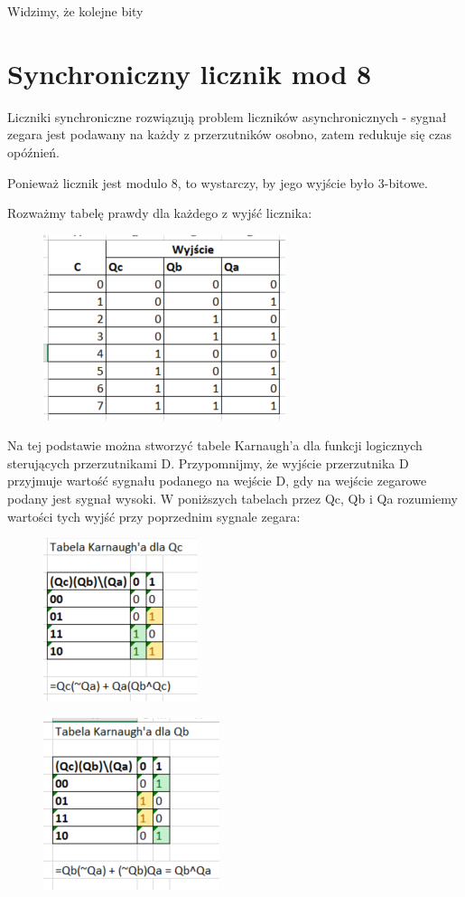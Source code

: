 \documentclass[12pt,a4paper]{article}
\begin{document}
Widzimy, że kolejne bity



\section{Synchroniczny licznik mod 8}

Liczniki synchroniczne rozwiązują problem liczników asynchronicznych - sygnał zegara jest podawany na każdy z przerzutników osobno, zatem redukuje się czas opóźnień.

Ponieważ licznik jest modulo 8, to wystarczy, by jego wyjście było 3-bitowe.

Rozważmy tabelę prawdy dla każdego z wyjść licznika:

\begin{figure}[H]
\centering
\includegraphics{img/4c_table}
\end{figure}

Na tej podstawie można stworzyć tabele Karnaugh'a dla funkcji logicznych sterujących przerzutnikami D.
Przypomnijmy, że wyjście przerzutnika D przyjmuje wartość sygnału podanego na wejście D, gdy na wejście zegarowe podany jest sygnał wysoki.
W poniższych tabelach przez Qc, Qb i Qa rozumiemy wartości tych wyjść przy poprzednim sygnale zegara:
 

\begin{figure}[H]
\centering
\includegraphics{img/4c_table_qc}
\end{figure}

\begin{figure}[H]
\centering
\includegraphics{img/4c_table_qb}
\end{figure}
\end{document}
